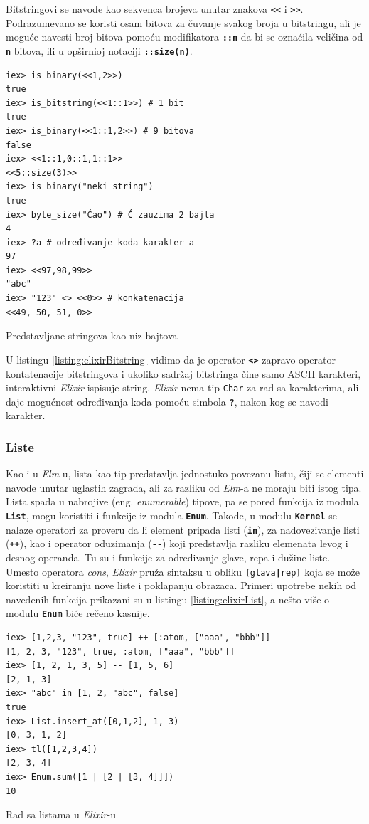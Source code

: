 \documentclass[12pt,oneside]{memoir}
\begin{document}
Bitstringovi se navode kao sekvenca brojeva unutar znakova
\texttt{\textbf{<\smallskip<}} i \texttt{\textbf{>\smallskip>}}. Podrazumevano se koristi
osam bitova za čuvanje svakog broja u bitstringu, ali je moguće navesti broj bitova pomoću
modifikatora \texttt{\textbf{::n}} da bi se oznaćila veličina od \texttt{\textbf{n}} bitova,
ili u opširnioj notaciji \texttt{\textbf{::size(n)}}.
\begin{listing}[!h]
\begin{verbatim}
iex> is_binary(<<1,2>>)
true
iex> is_bitstring(<<1::1>>) # 1 bit
true
iex> is_binary(<<1::1,2>>) # 9 bitova
false
iex> <<1::1,0::1,1::1>>
<<5::size(3)>>
iex> is_binary("neki string")
true
iex> byte_size("Ćao") # Ć zauzima 2 bajta
4
iex> ?a # određivanje koda karakter a
97
iex> <<97,98,99>>  
"abc"
iex> "123" <> <<0>> # konkatenacija
<<49, 50, 51, 0>>
\end{verbatim}
\caption{Predstavljane stringova kao niz bajtova}
\label{listing:elixirBitstring}
\end{listing}
U listingu \ref{listing:elixirBitstring} vidimo da je operator \texttt{\textbf{<>}} zapravo
operator kontatenacije bitstringova i ukoliko sadržaj bitstringa čine samo ASCII
karakteri, interaktivni \emph{Elixir} ispisuje string. \emph{Elixir} nema tip \texttt{Char} za rad sa
karakterima, ali daje mogućnost određivanja koda pomoću simbola \texttt{\textbf{?}}, nakon 
kog se navodi karakter. 

\subsubsection{Liste}
Kao i u \emph{Elm}-u, lista kao tip predstavlja jednostuko povezanu listu, čiji se elementi navode
unutar uglastih zagrada, ali za razliku od \emph{Elm}-a ne moraju biti istog tipa. Lista spada u 
nabrojive (eng. \emph{enumerable}) tipove, pa se pored funkcija iz modula \texttt{\textbf{List}},
mogu koristiti i funkcije iz modula \texttt{\textbf{Enum}}. Takođe, u modulu \texttt{\textbf{Kernel}}
se nalaze operatori za proveru da li element pripada listi (\texttt{\textbf{in}}), za nadovezivanje
listi (\texttt{\textbf{++}}), kao i operator oduzimanja (\texttt{\textbf{-{}-}}) koji predstavlja
razliku elemenata levog i desnog operanda. Tu su i funkcije za određivanje
glave, repa i dužine liste. Umesto operatora \emph{cons}, \emph{Elixir} pruža sintaksu u obliku
\texttt{\textbf{[}glava\textbf{|}rep\textbf{]}} koja se može koristiti u kreiranju nove
liste i poklapanju obrazaca. Primeri upotrebe nekih od navedenih funkcija prikazani su u
listingu \ref{listing:elixirList}, a nešto više o modulu \texttt{\textbf{Enum}} biće rečeno kasnije. 
\begin{listing}[h]
\begin{verbatim}
iex> [1,2,3, "123", true] ++ [:atom, ["aaa", "bbb"]]
[1, 2, 3, "123", true, :atom, ["aaa", "bbb"]]
iex> [1, 2, 1, 3, 5] -- [1, 5, 6]
[2, 1, 3]
iex> "abc" in [1, 2, "abc", false]
true
iex> List.insert_at([0,1,2], 1, 3)
[0, 3, 1, 2]
iex> tl([1,2,3,4])
[2, 3, 4]
iex> Enum.sum([1 | [2 | [3, 4]]])
10
\end{verbatim}
\caption{Rad sa listama u \emph{Elixir}-u}
\label{listing:elixirList}
\end{listing}
\end{document}

